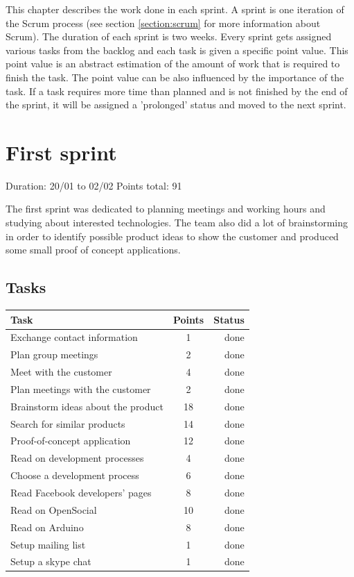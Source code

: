 
This chapter describes the work done in each sprint. A sprint is one iteration of the Scrum process
(see section \ref{section:scrum} for more information about Scrum). The duration of each sprint is two weeks.
Every sprint gets assigned various tasks from the backlog and each task is given a specific point value.
This point value is an abstract estimation of the amount of work that is required to finish the task.
The point value can be also influenced by the importance of the task. If a task requires more time than
planned and is not finished by the end of the sprint, it will be assigned a 'prolonged' status and
moved to the next sprint.

\newpage

\section{First sprint}

Duration: 20/01 to 02/02
Points total: 91

The first sprint was dedicated to planning meetings and working hours
and studying about interested technologies. The team also did a lot of
brainstorming in order to identify possible product ideas to show the
customer and produced some small proof of concept applications.

\subsection{Tasks}

\begin{table}[ht!]
\begin{tabular}{ | l | c | r | }

\hline
\textbf{Task} & \textbf{Points} & \textbf{Status} \\
\hline

Exchange contact information		& 1  & done \\
\hline
Plan group meetings					& 2  & done \\
\hline
Meet with the customer				& 4  & done \\
\hline
Plan meetings with the customer		& 2  & done \\
\hline
Brainstorm ideas about the product	& 18 & done \\
\hline
Search for similar products			& 14 & done \\
\hline
Proof-of-concept application		& 12 & done \\
\hline
Read on development processes		& 4  & done \\
\hline
Choose a development process		& 6  & done \\
\hline
Read Facebook developers' pages		& 8  & done \\
\hline
Read on OpenSocial					& 10 & done \\
\hline
Read on Arduino						& 8  & done \\
\hline
Setup mailing list					& 1  & done \\
\hline
Setup a skype chat					& 1  & done \\
\hline

\end{tabular}
\end{table}


